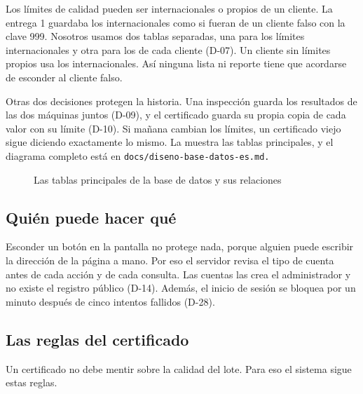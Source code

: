 Los límites de calidad pueden ser internacionales o propios de un cliente. La entrega 1 guardaba los internacionales como si fueran de un cliente falso con la clave 999. Nosotros usamos dos tablas separadas, una para los límites internacionales y otra para los de cada cliente (D-07). Un cliente sin límites propios usa los internacionales. Así ninguna lista ni reporte tiene que acordarse de esconder al cliente falso.

Otras dos decisiones protegen la historia. Una inspección guarda los resultados de las dos máquinas juntos (D-09), y el certificado guarda su propia copia de cada valor con su límite (D-10). Si mañana cambian los límites, un certificado viejo sigue diciendo exactamente lo mismo. La  muestra las tablas principales, y el diagrama completo está en \tt{docs/diseno-base-datos-es.md}.

\begin{figure}[H]
  \centering
  \resizebox{\linewidth}{!}{}
  \caption{Las tablas principales de la base de datos y sus relaciones}\label{fig:datos}
\end{figure}

\subsection{Quién puede hacer qué}\label{sec:permisos}

Esconder un botón en la pantalla no protege nada, porque alguien puede escribir la dirección de la página a mano. Por eso el servidor revisa el tipo de cuenta antes de cada acción y de cada consulta. Las cuentas las crea el administrador y no existe el registro público (D-14). Además, el inicio de sesión se bloquea por un minuto después de cinco intentos fallidos (D-28).

\subsection{Las reglas del certificado}\label{sec:reglas}

Un certificado no debe mentir sobre la calidad del lote. Para eso el sistema sigue estas reglas.

